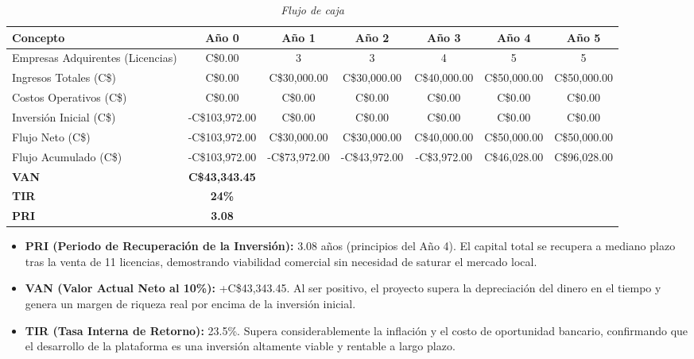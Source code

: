 \begin{table}[htbp]
	\centering
	\caption{\emph{Flujo de caja}}
	\label{tab:flujo_caja}
	\small
	\begin{tabularx}{\textwidth}{X c c c c c c}
		\toprule
		\textbf{Concepto} & \textbf{Año 0} & \textbf{Año 1} & \textbf{Año 2} & \textbf{Año 3} & \textbf{Año 4} & \textbf{Año 5} \\
		\midrule
		Empresas Adquirentes (Licencias) & C\$0.00 & 3 & 3 & 4 & 5 & 5 \\
		Ingresos Totales (C\$) & C\$0.00 & C\$30,000.00 & C\$30,000.00 & C\$40,000.00 & C\$50,000.00 & C\$50,000.00 \\
		Costos Operativos (C\$) & C\$0.00 & C\$0.00 & C\$0.00 & C\$0.00 & C\$0.00 & C\$0.00 \\
		Inversión Inicial (C\$) & -C\$103,972.00 & C\$0.00 & C\$0.00 & C\$0.00 & C\$0.00 & C\$0.00 \\
		Flujo Neto (C\$) & -C\$103,972.00 & C\$30,000.00 & C\$30,000.00 & C\$40,000.00 & C\$50,000.00 & C\$50,000.00 \\
		Flujo Acumulado (C\$) & -C\$103,972.00 & -C\$73,972.00 & -C\$43,972.00 & -C\$3,972.00 & C\$46,028.00 & C\$96,028.00 \\
		\midrule
		\textbf{VAN} & \textbf{C\$43,343.45} & & & & & \\
		\textbf{TIR} & \textbf{24\%} & & & & & \\
		\textbf{PRI} & \textbf{3.08} & & & & & \\
		\bottomrule
	\end{tabularx}
\end{table}

\begin{itemize}
	\item \textbf{PRI (Periodo de Recuperación de la Inversión):} 3.08 años (principios del Año 4). El capital total se recupera a mediano plazo tras la venta de 11 licencias, demostrando viabilidad comercial sin necesidad de saturar el mercado local.
	\item \textbf{VAN (Valor Actual Neto al 10\%):} +C\$43,343.45. Al ser positivo, el proyecto supera la depreciación del dinero en el tiempo y genera un margen de riqueza real por encima de la inversión inicial.
	\item \textbf{TIR (Tasa Interna de Retorno):} 23.5\%. Supera considerablemente la inflación y el costo de oportunidad bancario, confirmando que el desarrollo de la plataforma es una inversión altamente viable y rentable a largo plazo.
\end{itemize}

